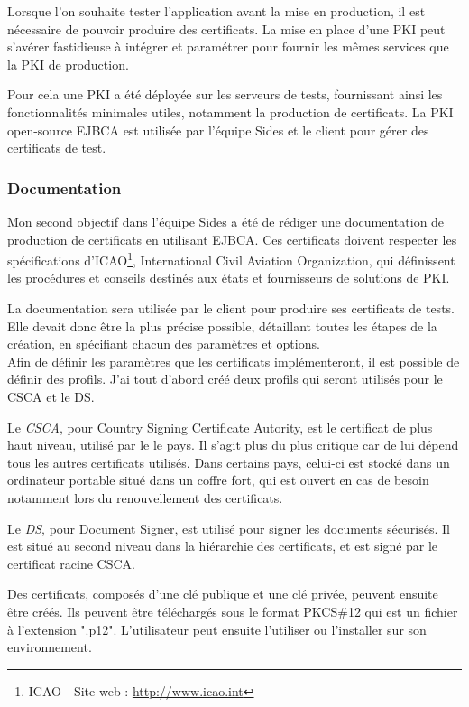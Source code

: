Lorsque l'on souhaite tester l'application avant la mise en production, il est nécessaire de pouvoir produire des certificats.
La mise en place d'une PKI peut s'avérer fastidieuse à intégrer et paramétrer pour fournir les mêmes services que la PKI de production.

Pour cela une PKI a été déployée sur les serveurs de tests, fournissant ainsi les fonctionnalités minimales utiles, notamment la production de certificats.
La PKI open-source EJBCA est utilisée par l'équipe Sides et le client pour gérer des certificats de test.


\subsubsection{Documentation}

Mon second objectif dans l'équipe Sides a été de rédiger une documentation de production de certificats en utilisant EJBCA.
Ces certificats doivent respecter les spécifications d'ICAO\footnote{ICAO - Site web : \url{http://www.icao.int}}, International Civil Aviation Organization, qui définissent les procédures et conseils destinés aux états et fournisseurs de solutions de PKI.

La documentation sera utilisée par le client pour produire ses certificats de tests.
Elle devait donc être la plus précise possible, détaillant toutes les étapes de la création, en spécifiant chacun des paramètres et options.
\\

Afin de définir les paramètres que les certificats implémenteront, il est possible de définir des profils.
J'ai tout d'abord créé deux profils qui seront utilisés pour le CSCA et le DS.

Le \textit{CSCA}, pour Country Signing Certificate Autority, est le certificat de plus haut niveau, utilisé par le le pays.
Il s'agit plus du plus critique car de lui dépend tous les autres certificats utilisés.
Dans certains pays, celui-ci est stocké dans un ordinateur portable situé dans un coffre fort, qui est ouvert en cas de besoin notamment lors du renouvellement des certificats.

Le \textit{DS}, pour Document Signer, est utilisé pour signer les documents sécurisés.
Il est situé au second niveau dans la hiérarchie des certificats, et est signé par le certificat racine CSCA.

Des certificats, composés d'une clé publique et une clé privée, peuvent ensuite être créés.
Ils peuvent être téléchargés sous le format PKCS\#12 qui est un fichier à l'extension ".p12".
L'utilisateur peut ensuite l'utiliser ou l'installer sur son environnement.

